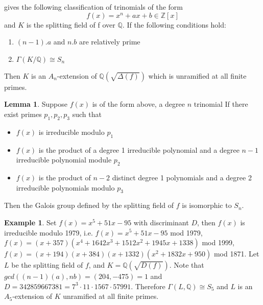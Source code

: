 \documentclass[12pt]{extarticle}
\newcommand{\Q}{\mathbb{Q}}
\newcommand{\<}{\langle}
\renewcommand{\>}{\rangle}
\theoremstyle{definition}
\newtheorem*{example}{Example}
\newtheorem{lemma}{Lemma}
\begin{document}
\cite{YAMA1970} gives the following classification of trinomials of the form 
\begin{equation}
    f(x) = x^n+ax+b \in \mathbb{Z}[x]
\end{equation}and $K$ is the splitting field of f over $\Q$.
If the following conditions hold:
\begin{enumerate}
    \item $(n-1).a$ and $n.b$ are relatively prime 
    \item $\Gamma(K/\mathbb{Q}) \cong S_n$
\end{enumerate}\par
Then $K$ is an $A_n$-extension of $\Q\left( \sqrt{\Delta(f)}\right)$ which is unramified at all finite primes.
\begin{lemma}
Suppose $f(x)$ is of the form above, a degree $n$ trinomial If there exist primes $p_1, p_2, p_3$ such that \begin{itemize}
\item $f(x)$ is irreducible modulo $p_1$
\item $f(x)$ is the product of a degree 1 irreducible polynomial and a degree $n-1$ irreducible polynomial module $p_2$
\item $f(x)$ is the product of $n-2$ distinct degree 1 polynomials and a degree 2 irreducible polynomials modulo $p_3$
\end{itemize}
Then the Galois group defined by the splitting field of $f$ is isomorphic to $S_n$.
\end{lemma}
\begin{example}
Set $f(x)= x^5+51x-95$ with discriminant $D$, then $f(x)$ is irreducible modulo 1979, i.e. $f(x)= x^5+51x-95 $ mod 1979, 
$f(x)=(x + 357)(x^4 + 1642x^3 + 1512 x^2 + 1945x + 1338)$ mod 1999, $f(x)=(
x + 194)(x + 384)(x + 1332)(x^2 + 1832x + 950)$ mod 1871. Let $L$ be the splitting field of $f$, and $K = \Q(\sqrt{D(f)})$.    
Note that $gcd((n-1)(a),nb) = (204,-475)=1$ and $D = 342859667381 = 7^3 \cdot 11 \cdot 1567 \cdot 57991$. Therefore $\Gamma(L,\Q) \cong S_5$ and $L$ is an $A_5$-extension of $K$ unramified at all finite primes.
\end{example}

\end{document}
